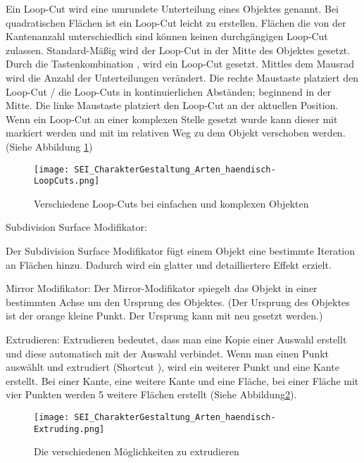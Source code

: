 Ein Loop-Cut wird eine umrundete Unterteilung eines Objektes genannt. Bei quadratischen Flächen ist ein Loop-Cut leicht
zu erstellen. Flächen die von der Kantenanzahl unterschiedlich sind können keinen durchgängigen Loop-Cut zulassen.
Standard-Mäßig wird der Loop-Cut in der Mitte des Objektes gesetzt. Durch die Tastenkombination ,
wird ein Loop-Cut gesetzt. Mittles dem Mausrad wird die Anzahl der Unterteilungen verändert. Die rechte Maustaste
platziert den Loop-Cut / die Loop-Cuts in kontinuierlichen Abständen; beginnend in der Mitte. Die linke Maustaste
platziert den Loop-Cut an der aktuellen Position. Wenn ein Loop-Cut an einer komplexen Stelle gesetzt wurde kann dieser
mit  markiert werden und mit  im relativen Weg zu dem Objekt verschoben werden.
(Siehe Abbildung \ref{picture:loop_cut_slide})

\begin{figure}[H]
    \centering
    \texttt{[image: SEI\_CharakterGestaltung\_Arten\_haendisch-LoopCuts.png]}
    \caption{Verschiedene Loop-Cuts bei einfachen und komplexen Objekten}
    \label{picture:loop_cut_slide}
\end{figure}


Subdivision Surface Modifikator\citep{blender:mod_subd}:

Der Subdivision Surface Modifikator fügt einem Objekt eine bestimmte Iteration an Flächen hinzu. Dadurch wird ein
glatter und detailliertere Effekt erzielt.


Mirror Modifikator\citep{blender:mod_mirror}:
Der Mirror-Modifikator spiegelt das Objekt in einer bestimmten Achse um den Ursprung des Objektes.
(Der Ursprung des Objektes ist der orange kleine Punkt. Der Ursprung kann mit  neu gesetzt werden.)

Extrudieren\citep{blender:extrude}:
Extrudieren bedeutet, dass man eine Kopie einer Auswahl erstellt und diese automatisch mit der Auswahl verbindet.
Wenn man einen Punkt auswählt und extrudiert (Shortcut ), wird ein weiterer Punkt und eine Kante erstellt.
Bei einer Kante, eine weitere Kante und eine Fläche, bei einer Fläche mit vier Punkten werden 5 weitere Flächen erstellt
(Siehe Abbildung\ref{picture:extrude}).

\begin{figure}[H]
    \centering
    \texttt{[image: SEI\_CharakterGestaltung\_Arten\_haendisch-Extruding.png]}
    \caption{Die verschiedenen Möglichkeiten zu extrudieren}
    \label{picture:extrude}
\end{figure}


